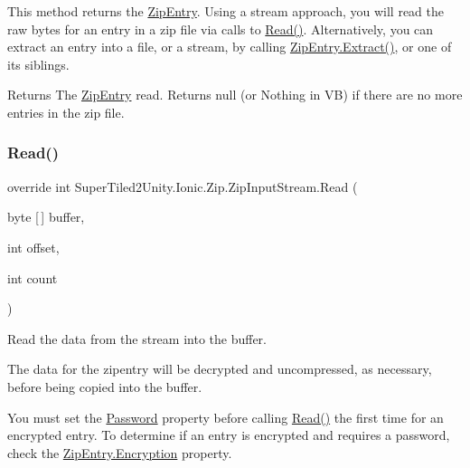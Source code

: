 This method returns the {\ttfamily \mbox{\hyperlink{class_super_tiled2_unity_1_1_ionic_1_1_zip_1_1_zip_entry}{Zip\+Entry}}}. Using a stream approach, you will read the raw bytes for an entry in a zip file via calls to {\ttfamily \mbox{\hyperlink{class_super_tiled2_unity_1_1_ionic_1_1_zip_1_1_zip_input_stream_a172a23a02d3c7a34db7c6648c55fd299}{Read()}}}. Alternatively, you can extract an entry into a file, or a stream, by calling \mbox{\hyperlink{class_super_tiled2_unity_1_1_ionic_1_1_zip_1_1_zip_entry_a9d65543aadd23e47e188175412891b42}{Zip\+Entry.\+Extract()}}, or one of its siblings. 

\begin{DoxyReturn}{Returns}
The {\ttfamily \mbox{\hyperlink{class_super_tiled2_unity_1_1_ionic_1_1_zip_1_1_zip_entry}{Zip\+Entry}}} read. Returns null (or Nothing in VB) if there are no more entries in the zip file. 
\end{DoxyReturn}
\mbox{\label{class_super_tiled2_unity_1_1_ionic_1_1_zip_1_1_zip_input_stream_a172a23a02d3c7a34db7c6648c55fd299}} 
\subsubsection{\texorpdfstring{Read()}{Read()}}
{\footnotesize\ttfamily override int Super\+Tiled2\+Unity.\+Ionic.\+Zip.\+Zip\+Input\+Stream.\+Read (\begin{DoxyParamCaption}\item[{byte \mbox{[}$\,$\mbox{]}}]{buffer,  }\item[{int}]{offset,  }\item[{int}]{count }\end{DoxyParamCaption})}



Read the data from the stream into the buffer. 

The data for the zipentry will be decrypted and uncompressed, as necessary, before being copied into the buffer. 

You must set the \mbox{\hyperlink{class_super_tiled2_unity_1_1_ionic_1_1_zip_1_1_zip_input_stream_a152dfe460b16330a160db99eeffcf07c}{Password}} property before calling {\ttfamily \mbox{\hyperlink{class_super_tiled2_unity_1_1_ionic_1_1_zip_1_1_zip_input_stream_a172a23a02d3c7a34db7c6648c55fd299}{Read()}}} the first time for an encrypted entry. To determine if an entry is encrypted and requires a password, check the \mbox{\hyperlink{class_super_tiled2_unity_1_1_ionic_1_1_zip_1_1_zip_entry_ab8de4882ffe896d2657b27264807ef1c}{Zip\+Entry.\+Encryption}} property. 


